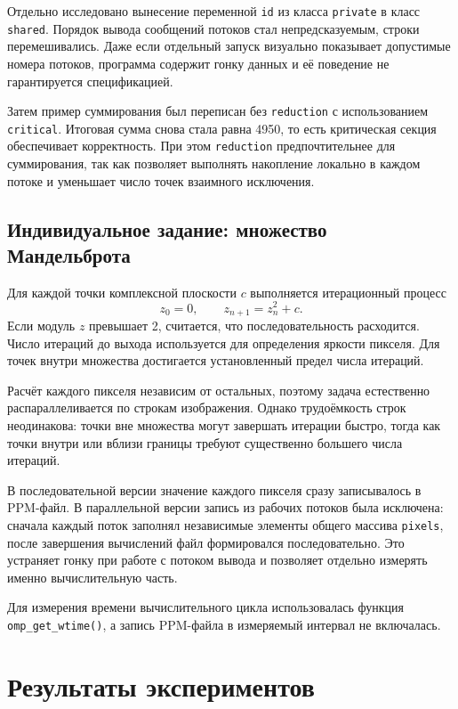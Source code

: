 \documentclass[12pt,a4paper]{article}
\begin{document}
Отдельно исследовано вынесение переменной \texttt{id} из класса \texttt{private} в класс \texttt{shared}. Порядок вывода сообщений потоков стал непредсказуемым, строки перемешивались. Даже если отдельный запуск визуально показывает допустимые номера потоков, программа содержит гонку данных и её поведение не гарантируется спецификацией.

Затем пример суммирования был переписан без \texttt{reduction} с использованием \texttt{critical}. Итоговая сумма снова стала равна 4950, то есть критическая секция обеспечивает корректность. При этом \texttt{reduction} предпочтительнее для суммирования, так как позволяет выполнять накопление локально в каждом потоке и уменьшает число точек взаимного исключения.

\subsection{Индивидуальное задание: множество Мандельброта}

Для каждой точки комплексной плоскости $c$ выполняется итерационный процесс
\[
z_0 = 0, \qquad z_{n+1}=z_n^2+c.
\]
Если модуль $z$ превышает 2, считается, что последовательность расходится. Число итераций до выхода используется для определения яркости пикселя. Для точек внутри множества достигается установленный предел числа итераций.

Расчёт каждого пикселя независим от остальных, поэтому задача естественно распараллеливается по строкам изображения. Однако трудоёмкость строк неодинакова: точки вне множества могут завершать итерации быстро, тогда как точки внутри или вблизи границы требуют существенно большего числа итераций.

В последовательной версии значение каждого пикселя сразу записывалось в PPM-файл. В параллельной версии запись из рабочих потоков была исключена: сначала каждый поток заполнял независимые элементы общего массива \texttt{pixels}, после завершения вычислений файл формировался последовательно. Это устраняет гонку при работе с потоком вывода и позволяет отдельно измерять именно вычислительную часть.

Для измерения времени вычислительного цикла использовалась функция \texttt{omp\_get\_wtime()}, а запись PPM-файла в измеряемый интервал не включалась.

\section{Результаты экспериментов}
\end{document}
